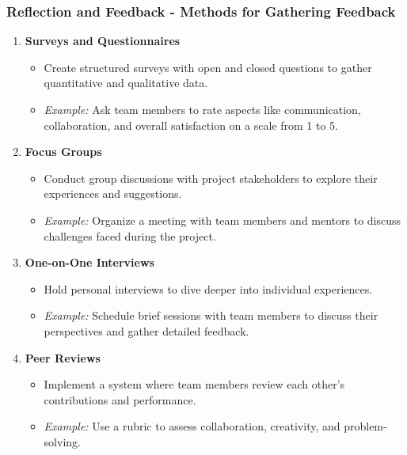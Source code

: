 \documentclass{beamer}
\begin{document}
\begin{frame}[fragile]
    \frametitle{Reflection and Feedback - Methods for Gathering Feedback}
    \begin{enumerate}
        \item \textbf{Surveys and Questionnaires}
            \begin{itemize}
                \item Create structured surveys with open and closed questions to gather quantitative and qualitative data.
                \item \textit{Example:} Ask team members to rate aspects like communication, collaboration, and overall satisfaction on a scale from 1 to 5.
            \end{itemize}
        \item \textbf{Focus Groups}
            \begin{itemize}
                \item Conduct group discussions with project stakeholders to explore their experiences and suggestions.
                \item \textit{Example:} Organize a meeting with team members and mentors to discuss challenges faced during the project.
            \end{itemize}
        \item \textbf{One-on-One Interviews}
            \begin{itemize}
                \item Hold personal interviews to dive deeper into individual experiences.
                \item \textit{Example:} Schedule brief sessions with team members to discuss their perspectives and gather detailed feedback.
            \end{itemize}
        \item \textbf{Peer Reviews}
            \begin{itemize}
                \item Implement a system where team members review each other's contributions and performance.
                \item \textit{Example:} Use a rubric to assess collaboration, creativity, and problem-solving.
            \end{itemize}
    \end{enumerate}
\end{frame}
\end{document}
